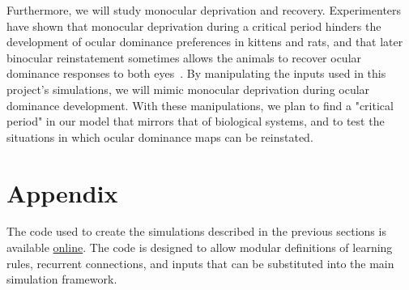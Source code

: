 \documentclass[pageno]{mat323paper}
\begin{document}
Furthermore, we will study monocular deprivation and recovery. Experimenters have shown that monocular deprivation during a critical period hinders the development of ocular dominance preferences in kittens and rats, and that later binocular reinstatement sometimes allows the animals to recover ocular dominance responses to both eyes~\cite{feldman_synaptic_2009}\cite{mitchell_recovery_1977}. By manipulating the inputs used in this project's simulations, we will mimic monocular deprivation during ocular dominance development. With these manipulations, we plan to find a "critical period" in our model that mirrors that of biological systems, and to test the situations in which ocular dominance maps can be reinstated.




\section{Appendix}\label{sec:Appendix}
The code used to create the simulations described in the previous sections is available \href{https://github.com/cchen23/ocular_dominance_learning_rules}{online}. The code is designed to allow modular definitions of learning rules, recurrent connections, and inputs that can be substituted into the main simulation framework.
\end{document}
